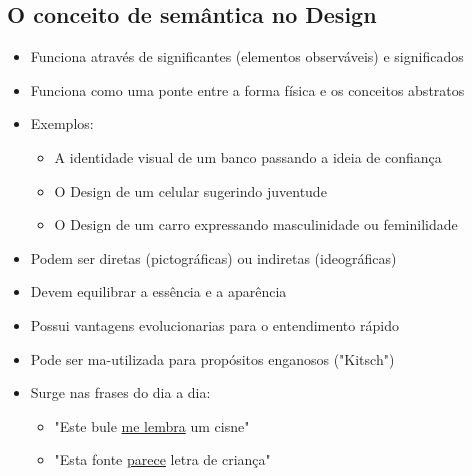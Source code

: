 \documentclass{article}
\begin{document}
\subsection{O conceito de semântica no Design}
\begin{itemize}
    \item Funciona através de significantes (elementos observáveis) e significados
    \item Funciona como uma ponte entre a forma física e os conceitos abstratos
    \item Exemplos:
    \begin{itemize}
        \item A identidade visual de um banco passando a ideia de confiança
        \item O Design de um celular sugerindo juventude
        \item O Design de um carro expressando masculinidade ou feminilidade 
    \end{itemize}
    \item Podem ser diretas (pictográficas) ou indiretas (ideográficas)
    \item Devem equilibrar a essência e a aparência
    \item Possui vantagens evolucionarias para o entendimento rápido
    \item Pode ser ma-utilizada para propósitos enganosos ("Kitsch")
    \item Surge nas frases do dia a dia:
    \begin{itemize}
        \item "Este bule \underline{me lembra} um cisne"
        \item "Esta fonte \underline{parece} letra de criança"
    \end{itemize}
\end{itemize}
\end{document}
